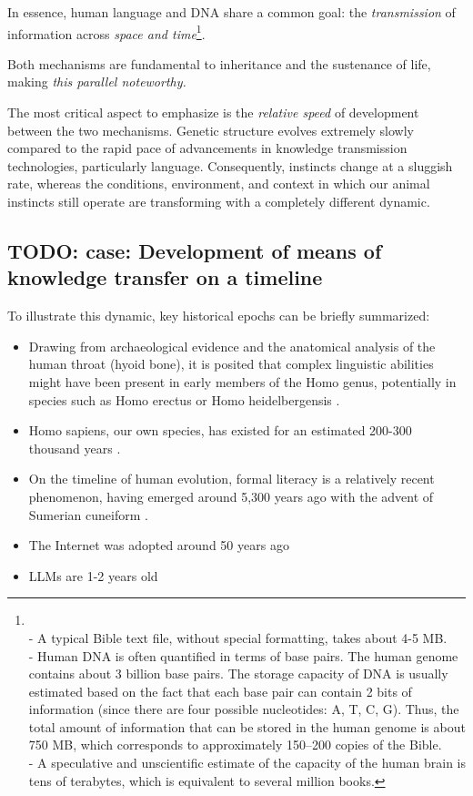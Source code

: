 \documentclass[11pt,a4]{article}
\begin{document}
\par
In essence, human language and DNA share a common goal: the \textit{transmission} of information across \textit{space and time}\footnote{\\- A typical Bible text file, without special formatting, takes about 4-5 MB. \\
- Human DNA is often quantified in terms of base pairs. The human genome contains about 3 billion base pairs. The storage capacity of DNA is usually estimated based on the fact that each base pair can contain 2 bits of information (since there are four possible nucleotides: A, T, C, G).
Thus, the total amount of information that can be stored in the human genome is about 750 MB, which corresponds to approximately 150–200 copies of the Bible.\\
- A speculative and unscientific estimate of the capacity of the human brain is tens of terabytes, which is equivalent to several million books.



}.

\par
Both mechanisms are fundamental to inheritance and the sustenance of life, making \textit{this parallel noteworthy.}

\par
The most critical aspect to emphasize is the \textit{relative speed} of development between the two mechanisms. Genetic structure evolves extremely slowly compared to the rapid pace of advancements in knowledge transmission technologies, particularly language. Consequently, instincts change at a sluggish rate, whereas the conditions, environment, and context in which our animal instincts still operate are transforming with a completely different dynamic.





    \subsection{TODO: case: Development of means of knowledge transfer on a timeline}
 To illustrate this dynamic, key historical epochs can be briefly summarized:


    \begin{itemize}
        \item Drawing from archaeological evidence and the anatomical analysis of the human throat (hyoid bone), it is posited that complex linguistic abilities might have been present in early members of the Homo genus, potentially in species such as Homo erectus or Homo heidelbergensis \cite{Capasso2008AHE}.
        \item Homo sapiens, our own species, has existed for an estimated 200-300 thousand years \cite{Vidal}.
        \item On the timeline of human evolution, formal literacy is a relatively recent phenomenon, having emerged around 5,300 years ago with the advent of Sumerian cuneiform \cite{Walker}.
        \item The Internet was adopted around 50 years ago
        \item LLMs are 1-2 years old
    \end{itemize}
\end{document}
